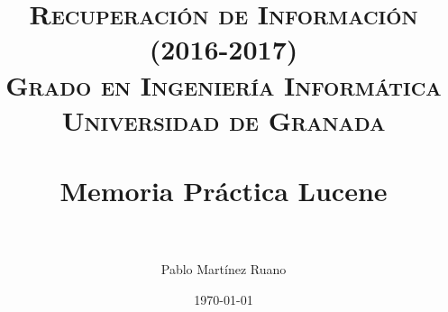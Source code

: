 

\sffamily


\title{	
\normalfont \normalsize 
\textsc{{\bf Recuperación de Información (2016-2017)} \\ Grado en Ingeniería Informática \\ Universidad de Granada} \\ [25pt] %
\horrule{0.5pt} \\[0.4cm] %
\huge Memoria Práctica Lucene \\ %
\horrule{2pt} \\[0.5cm] %
}

\author{Pablo Martínez Ruano} %

\date{\normalsize\today} %


\usepackage{url}
\usepackage{hyperref}
\usepackage{csquotes}
\usepackage{listings}




\maketitle %

\newpage %

\tableofcontents %

\listoffigures

\listoftables

\newpage


